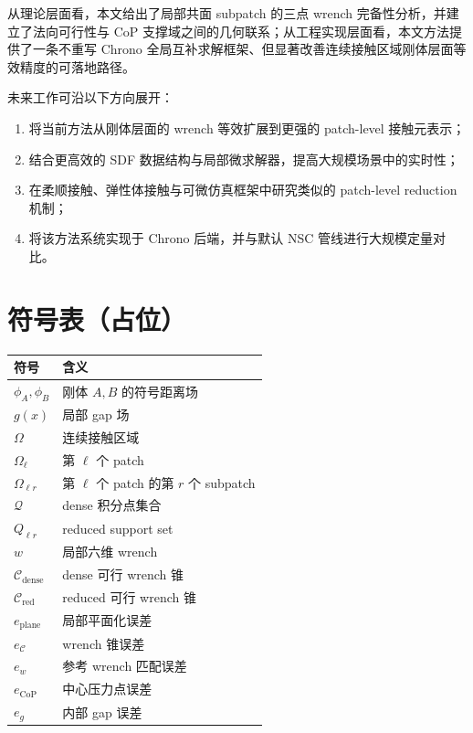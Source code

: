 \documentclass[UTF8,a4paper,11pt]{ctexart}
\begin{document}
从理论层面看，本文给出了局部共面 subpatch 的三点 wrench 完备性分析，并建立了法向可行性与 CoP 支撑域之间的几何联系；从工程实现层面看，本文方法提供了一条不重写 Chrono 全局互补求解框架、但显著改善连续接触区域刚体层面等效精度的可落地路径。

未来工作可沿以下方向展开：
\begin{enumerate}[label=(\arabic*)]
    \item 将当前方法从刚体层面的 wrench 等效扩展到更强的 patch-level 接触元表示；
    \item 结合更高效的 SDF 数据结构与局部微求解器，提高大规模场景中的实时性；
    \item 在柔顺接触、弹性体接触与可微仿真框架中研究类似的 patch-level reduction 机制；
    \item 将该方法系统实现于 Chrono 后端，并与默认 NSC 管线进行大规模定量对比。
\end{enumerate}

\appendix
\section{符号表（占位）}

\begin{longtable}{p{}p{}}
\toprule
符号 & 含义 \\
\midrule
$\phi_A,\phi_B$ & 刚体 $A,B$ 的符号距离场 \\
$g(x)$ & 局部 gap 场 \\
$\Omega$ & 连续接触区域 \\
$\Omega_\ell$ & 第 $\ell$ 个 patch \\
$\Omega_{\ell r}$ & 第 $\ell$ 个 patch 的第 $r$ 个 subpatch \\
$\mathcal{Q}$ & dense 积分点集合 \\
$Q_{\ell r}$ & reduced support set \\
$w$ & 局部六维 wrench \\
$\mathcal{C}_{\mathrm{dense}}$ & dense 可行 wrench 锥 \\
$\mathcal{C}_{\mathrm{red}}$ & reduced 可行 wrench 锥 \\
$e_{\mathrm{plane}}$ & 局部平面化误差 \\
$e_{\mathcal{C}}$ & wrench 锥误差 \\
$e_w$ & 参考 wrench 匹配误差 \\
$e_{\mathrm{CoP}}$ & 中心压力点误差 \\
$e_g$ & 内部 gap 误差 \\
\bottomrule
\end{longtable}
\end{document}
